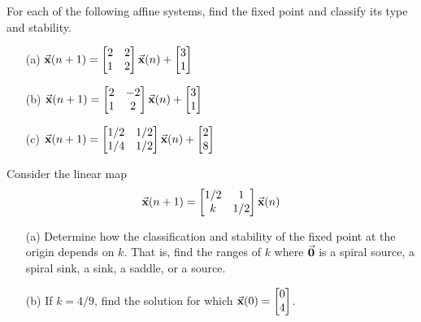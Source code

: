 \begin{exercises}
\begin{exercise}
For each of the following affine systems, find the
fixed point and classify its type and stability.
\begin{enumerate}
\item[(a)] $\displaystyle \vec{\textbf{x}}(n+1) = \begin{bmatrix}
                         2 & 2 \\
                         1 & 2
                     \end{bmatrix}
                        \vec{\textbf{x}}(n) + \begin{bmatrix} 3 \\ 1 \end{bmatrix}$
\item[(b)] $\displaystyle \vec{\textbf{x}}(n+1) = \begin{bmatrix}
                         2 & -2 \\
                         1 & 2
                     \end{bmatrix}
                        \vec{\textbf{x}}(n) + \begin{bmatrix} 3 \\ 1 \end{bmatrix}$
\item[(c)] $\displaystyle \vec{\textbf{x}}(n+1) = \begin{bmatrix}
                         1/2 & 1/2 \\
                         1/4 & 1/2
                     \end{bmatrix}
                        \vec{\textbf{x}}(n) + \begin{bmatrix} 2 \\ 8 \end{bmatrix}$
\end{enumerate}
\end{exercise}
\begin{exercise}
\label{ex:linmapwithparam}
Consider the linear map
\begin{equation}
  \vec{\textbf{x}}(n+1) = \begin{bmatrix} 1/2 & 1 \\ k & 1/2 \end{bmatrix}
                \vec{\textbf{x}}(n)
\end{equation}
\begin{enumerate}
\item[(a)]
Determine how the classification and stability of the fixed point at the
origin depends on $k$.
That is, find the ranges of $k$ where $\vec{\textbf{0}}$ is a spiral source,
a spiral sink, a sink, a saddle, or a source.
\item[(b)] If $k=4/9$, find the solution for which
$\vec{\textbf{x}}(0)=\begin{bmatrix} 0 \\ 4 \end{bmatrix}$.
\end{enumerate}
\end{exercise}
\end{exercises}

